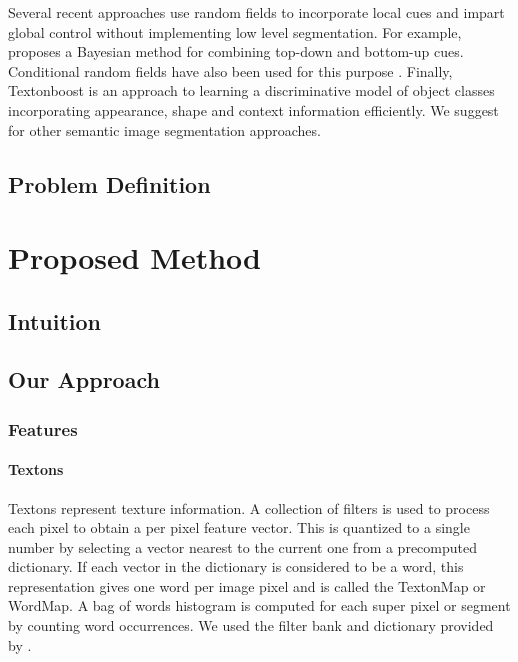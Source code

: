 \documentclass{article} %
\begin{document}
Several recent approaches use random fields to incorporate local cues and impart global control without implementing low level segmentation. For example, \cite{Kumar:2005:OC:1068507.1068889} proposes a Bayesian method for combining top-down and bottom-up cues. Conditional random fields have also been used for this purpose \cite{Kumar:2005:HFF:1097115.1097790} \cite{Richard04multiscaleconditional}. Finally, Textonboost \cite{Shotton06textonboost:joint} is an approach to learning a discriminative model of object classes incorporating appearance, shape and context information efficiently. We suggest \cite{SegmentRegionsParts} for other semantic image segmentation approaches.

\subsection{Problem Definition}
\label{sec:Problem}

\section{Proposed Method}
\label{sec:Proposed}
\subsection{Intuition}
\subsection{Our Approach}
\subsubsection{Features}
\paragraph{Textons}
Textons represent texture information.
A collection of filters is used to process each pixel to obtain a per
pixel feature vector.
This is quantized to a single number by selecting a vector nearest to the
current one from a precomputed dictionary.
If each vector in the dictionary is considered to be a word, this
representation gives one word per image pixel and is called the TextonMap
or WordMap. %
A bag of words histogram is computed for each super pixel or segment by
counting word occurrences.
We used the filter bank and dictionary provided by \cite{malisiewicz-cvpr08}.
\end{document}

